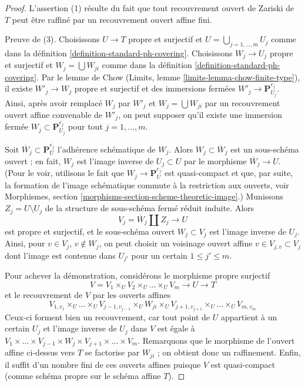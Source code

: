 \begin{proof}
L'assertion (1) résulte du fait que tout recouvrement ouvert de Zariski de $T$
peut être raffiné par un recouvrement ouvert affine fini.

\medskip\noindent
Preuve de (3). Choisissons $U \to T$ propre et surjectif et
$U = \bigcup_{j = 1, \ldots, m} U_j$ comme dans la
définition \ref{definition-standard-ph-covering}.
Choisissons $W_j \to U_j$ propre et surjectif et $W_j = \bigcup W_{ji}$
comme dans la définition \ref{definition-standard-ph-covering}.
Par le lemme de Chow (Limits, lemme \ref{limits-lemma-chow-finite-type}),
il existe $W'_j \to W_j$ propre et surjectif
et des immersions fermées $W'_j \to \mathbf{P}^{e_j}_{U_j}$.
Ainsi, après avoir remplacé $W_j$ par $W'_j$ et $W_j = \bigcup W_{ji}$
par un recouvrement ouvert affine convenable de $W'_j$, on peut supposer
qu'il existe une immersion fermée $W_j \subset \mathbf{P}^{e_j}_{U_j}$
pour tout $j = 1, \ldots, m$.

\medskip\noindent
Soit $\overline{W}_j \subset \mathbf{P}^{e_j}_U$ l'adhérence
schématique de $W_j$. Alors $W_j \subset \overline{W}_j$
est un sous-schéma ouvert ; en fait, $W_j$ est l'image inverse de
$U_j \subset U$ par le morphisme $\overline{W}_j \to U$.
(Pour le voir, utilisons le fait que $W_j \to \mathbf{P}^{e_j}_U$ est quasi-compact
et que, par suite, la formation de l'image schématique commute
à la restriction aux ouverts, voir
Morphismes, section \ref{morphisms-section-scheme-theoretic-image}.)
Munissons $Z_j = U \setminus U_j$
de la structure de sous-schéma fermé réduit induite.
Alors
$$
V_j = \overline{W}_j \amalg Z_j \to U
$$
est propre et surjectif, et le sous-schéma ouvert $W_j \subset V_j$
est l'image inverse de $U_j$. Ainsi, pour $v \in V_j$, $v \not \in W_j$,
on peut choisir un voisinage ouvert affine $v \in V_{j, v} \subset V_j$
dont l'image est contenue dans $U_{j'}$ pour un certain $1 \leq j' \leq m$.

\medskip\noindent
Pour achever la démonstration, considérons le morphisme propre surjectif
$$
V = V_1 \times_U V_2 \times_U \ldots \times_U V_m
\longrightarrow U \longrightarrow T
$$
et le recouvrement de $V$ par les ouverts affines
$$
V_{1, v_1} \times_U \ldots \times_U V_{j - 1, v_{j - 1}}
\times_U W_{j i} \times_U
V_{j + 1, v_{j + 1}} \times_U \ldots \times_U V_{m, v_m}
$$
Ceux-ci forment bien un recouvrement, car tout point de $U$ appartient
à un certain $U_j$ et l'image inverse de $U_j$ dans $V$ est égale à
$V_1 \times \ldots \times V_{j - 1} \times W_j \times V_{j + 1} \times
\ldots \times V_m$. Remarquons que le morphisme de
l'ouvert affine ci-dessus vers $T$ se factorise par $W_{ji}$ ;
on obtient donc un raffinement. Enfin, il suffit d'un nombre fini
de ces ouverts affines puisque $V$ est quasi-compact (comme schéma propre
sur le schéma affine $T$).
\end{proof}

